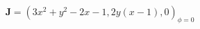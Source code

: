 \begin{equation}
\mathbf{J}=\left( 3x^{2}+y^{2}-2x-1,2y\left( x-1\right) ,0\right) _{\phi =0}
\end{equation}

